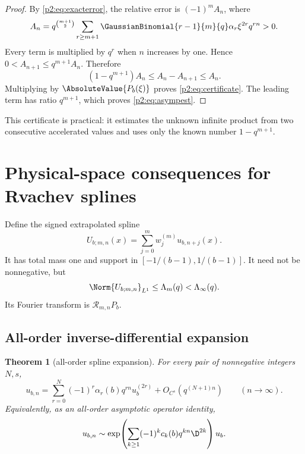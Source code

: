 \documentclass[11pt,oneside]{article}
\numberwithin{equation}{section}
\newtheorem{theorem}{Theorem}[section]
\theoremstyle{definition}
\theoremstyle{remark}
\begin{document}
\begin{proof}
By \eqref{p2:eq:exacterror}, the relative error is \((-1)^mA_n\), where
\[
 A_n=q^{\binom{m+1}{2}}
 \sum_{r\geq m+1}\GaussianBinomial{r-1}{m}{q}\alpha_r\xi^{2r}q^{rn}>0.
\]
Every term is multiplied by \(q^r\) when \(n\) increases by one. Hence
\(0<A_{n+1}\leq q^{m+1}A_n\). Therefore
\[
 (1-q^{m+1})A_n\leq A_n-A_{n+1}\leq A_n.
\]
Multiplying by \(\AbsoluteValue{P_b(\xi)}\) proves \eqref{p2:eq:certificate}. The leading
term has ratio \(q^{m+1}\), which proves \eqref{p2:eq:asympest}.
\end{proof}

This certificate is practical: it estimates the unknown infinite product from
two consecutive accelerated values and uses only the known number
\(1-q^{m+1}\).

\section{Physical-space consequences for Rvachev splines}
\label{p2:sec:physical}

Define the signed extrapolated spline
\begin{equation}
 U_{b;m,n}(x)=\sum_{j=0}^m w_j^{(m)}u_{b,n+j}(x).
 \label{p2:eq:Udef}
\end{equation}
It has total mass one and support in \([-1/(b-1),1/(b-1)]\). It need not be
nonnegative, but
\begin{equation}
 \Norm{U_{b;m,n}}_{L^1}\leq\Lambda_m(q)<\Lambda_\infty(q).
 \label{p2:eq:L1stable}
\end{equation}
Its Fourier transform is \(\mathcal R_{m,n}P_b\).

\subsection{All-order inverse-differential expansion}

\begin{theorem}[all-order spline expansion]
\label{p2:thm:CinftyExpansion}
For every pair of nonnegative integers \(N,s\),
\begin{equation}
 u_{b,n}
 =\sum_{r=0}^{N}(-1)^r\alpha_r(b)q^{rn}u_b^{(2r)}
 +O_{C^s}\!\left(q^{(N+1)n}\right)
 \qquad(n\to\infty).
 \label{p2:eq:physicalExpansion}
\end{equation}
Equivalently, as an all-order asymptotic operator identity,
\begin{equation}
 u_{b,n}\sim
 \exp\!\left(\sum_{k\geq1}(-1)^kc_k(b)q^{kn}\D^{2k}\right)u_b.
 \label{p2:eq:operatorPhysical}
\end{equation}
\end{theorem}
\end{document}

